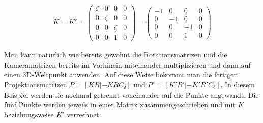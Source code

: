 \begin{gather}
K =	K'=
	\begin{pmatrix}
		\zeta&0&0&0\\
		0&\zeta&0&0\\
		0&0&\zeta&0\\
		0&0&1&0
	\end{pmatrix}=
	\begin{pmatrix}
		-1&0&0&0\\
		0&-1&0&0\\
		0&0&-1&0\\
		0&0&1&0
	\end{pmatrix}
\end{gather}

 Man kann natürlich wie bereits gewohnt die Rotationsmatrizen und die Kameramatrizen bereits im Vorhinein miteinander multiplizieren und dann auf einen 3D-Weltpunkt anwenden. Auf diese Weise bekommt man die fertigen Projektionsmatrizen  $P=[KR|-KRC_\delta]$ und $P'=[K'R'|-K'R'C_\delta]$. In diesem Beispiel werden sie nochmal getrennt voneinander auf die Punkte angewandt. Die fünf Punkte werden jeweils in einer Matrix zusammengeschrieben und mit $K$ beziehungsweise $K'$ verrechnet. 

